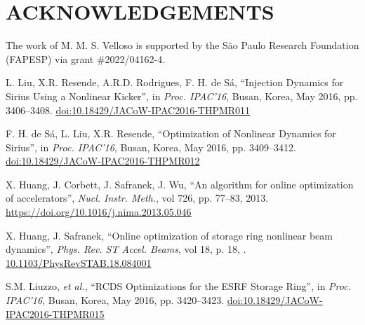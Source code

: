 \documentclass[a4paper,
               keeplastbox,   %
               ]{jacow}
\begin{document}
\section{ACKNOWLEDGEMENTS}
The work of M. M. S. Velloso is supported by the São Paulo Research Foundation (FAPESP) via grant \#2022/04162-4. 
%
%
	
	\begin{thebibliography}{9} %
	
        

        L. Liu, X.R. Resende, A.R.D. Rodrigues, F. H. de Sá,
       \textquotedblleft{{I}njection {D}ynamics for {S}irius {U}sing a {N}onlinear {K}icker}\textquotedblright,
       in \emph{Proc. IPAC’16}, Busan, Korea, May 2016, pp. 3406--3408.
       \url{doi:10.18429/JACoW-IPAC2016-THPMR011} 
 
        F. H. de Sá, L. Liu, X.R. Resende,
       \textquotedblleft{{O}ptimization of {N}onlinear {D}ynamics for {S}irius}\textquotedblright,
       in \emph{Proc. IPAC’16}, Busan, Korea, May 2016, pp. 3409--3412.
       \url{doi:10.18429/JACoW-IPAC2016-THPMR012}       
       
		X. Huang, J. Corbett, J. Safranek, J. Wu,
		\textquotedblleft{An algorithm for online optimization of accelerators}\textquotedblright,
		\emph{Nucl.  Instr. Meth.}, vol 726, pp. 77--83, 2013.
        \url{https://doi.org/10.1016/j.nima.2013.05.046} 

		X. Huang, J. Safranek,
		\textquotedblleft{Online optimization of storage ring nonlinear beam dynamics}\textquotedblright,
		\emph{Phys. Rev. ST Accel. Beams}, vol 18, p. 18, .
        \url{10.1103/PhysRevSTAB.18.084001} 
 
        S.M. Liuzzo, \emph{et al.},
        \textquotedblleft{RCDS Optimizations for the ESRF Storage Ring}\textquotedblright,
        in \emph{Proc. IPAC’16}, Busan, Korea, May 2016, pp. 3420--3423.
       \url{doi:10.18429/JACoW-IPAC2016-THPMR015}   
    

\end{thebibliography}
\end{document}
